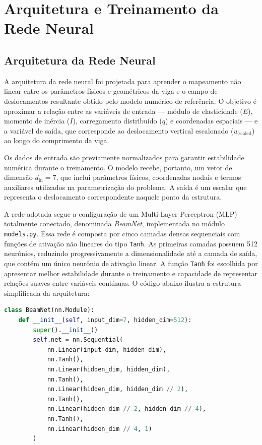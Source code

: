 \documentclass[12pt,openright,oneside,a4paper,english,brazil]{abntex2}
\begin{document}
\section{Arquitetura e Treinamento da Rede Neural}

\subsection{Arquitetura da Rede Neural}

A arquitetura da rede neural foi projetada para aprender o mapeamento não linear entre os parâmetros físicos e geométricos da viga e o campo de deslocamentos resultante obtido pelo modelo numérico de referência. O objetivo é aproximar a relação entre as variáveis de entrada — módulo de elasticidade ($E$), momento de inércia ($I$), carregamento distribuído ($q$) e coordenadas 
espaciais — e a variável de saída, que corresponde ao deslocamento vertical escalonado ($w_\text{scaled}$) ao longo do comprimento da viga.

Os dados de entrada são previamente normalizados para garantir estabilidade numérica durante o treinamento. O modelo recebe, portanto, um vetor de dimensão $d_\text{in}=7$, que inclui parâmetros físicos, coordenadas nodais e termos auxiliares utilizados na parametrização do problema. A saída é um escalar que representa o deslocamento correspondente naquele ponto da estrutura.

A rede adotada segue a configuração de um Multi-Layer Perceptron (MLP) totalmente conectado, denominada \textit{BeamNet}, implementada no módulo \texttt{models.py}. Essa rede é composta por cinco camadas densas sequenciais com funções de ativação não lineares do tipo \texttt{Tanh}. As primeiras camadas possuem 512 neurônios, reduzindo progressivamente a dimensionalidade até a camada de 
saída, que contém um único neurônio de ativação linear. A função \texttt{Tanh} foi escolhida por apresentar melhor estabilidade durante o treinamento e capacidade de representar relações suaves entre variáveis contínuas. O código abaixo ilustra a estrutura simplificada da arquitetura:

\begin{lstlisting}[language=Python, caption={Estrutura da rede neural BeamNet.}]
class BeamNet(nn.Module):
    def __init__(self, input_dim=7, hidden_dim=512):
        super().__init__()
        self.net = nn.Sequential(
            nn.Linear(input_dim, hidden_dim),
            nn.Tanh(),
            nn.Linear(hidden_dim, hidden_dim),
            nn.Tanh(),
            nn.Linear(hidden_dim, hidden_dim // 2),
            nn.Tanh(),
            nn.Linear(hidden_dim // 2, hidden_dim // 4),
            nn.Tanh(),
            nn.Linear(hidden_dim // 4, 1)
        )
\end{lstlisting}
\end{document}
